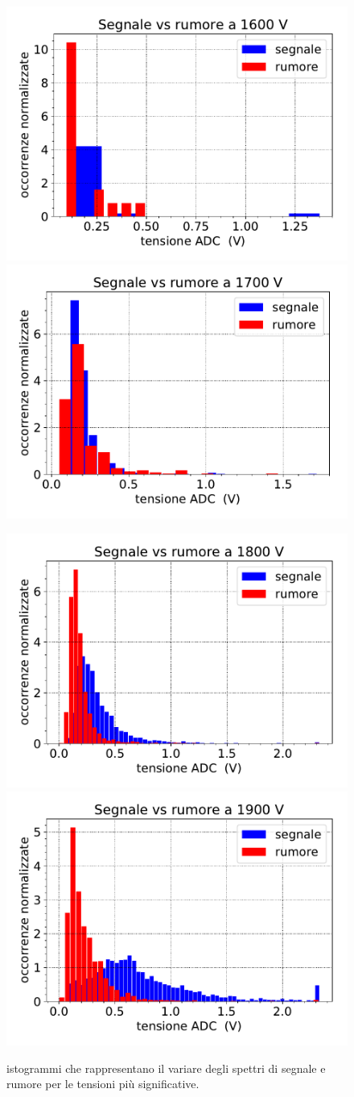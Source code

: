 \begin{figure}[h]
\hspace{-2cm}
{\includegraphics[width=8 cm]{1600}}
\qquad
{\includegraphics[width=8 cm]{1700}} 

\hspace{-2cm}
{\includegraphics[width=8 cm]{1800}}
\qquad
{\includegraphics[width=8 cm]{1900}}
\caption{istogrammi che rappresentano il variare degli spettri di segnale e rumore per le tensioni più significative.}
\label{quattro}
\end{figure}

